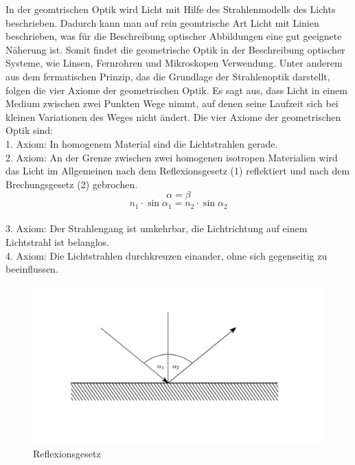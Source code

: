 In der geomtrischen Optik wird Licht mit Hilfe des Strahlenmodells des Lichts beschrieben. Dadurch kann man auf rein geomtrische Art Licht mit Linien beschrieben, was für die Beschreibung optischer Abbildungen eine gut geeignete Näherung ist. Somit findet die geometrische Optik in der Beschreibung optischer Systeme, wie Linsen, Fernrohren und Mikroskopen Verwendung. Unter anderem aus dem fermatischen Prinzip, das die Grundlage der Strahlenoptik darstellt, folgen die vier Axiome der geometrischen Optik. Es sagt aus, dass Licht in einem Medium zwischen zwei Punkten Wege nimmt, auf denen seine Laufzeit sich bei kleinen Variationen des Weges nicht ändert. Die vier Axiome der geometrischen Optik sind: \\
    1. Axiom: In homogenem Material sind die Lichtstrahlen gerade. \\
    2. Axiom: An der Grenze zwischen zwei homogenen isotropen Materialien wird das Licht im Allgemeinen nach dem Reflexionsgesetz (1) reflektiert und nach dem Brechungsgesetz (2) gebrochen. 
    \begin{equation}
        \alpha = \beta
    \end{equation}
    \begin{equation}
        n_1 \cdot \sin{\alpha_1} = n_2 \cdot \sin{\alpha_2}
    \end{equation}
    \\
    3. Axiom: Der Strahlengang ist umkehrbar, die Lichtrichtung auf einem Lichtstrahl ist belanglos. \\
    4. Axiom: Die Lichtstrahlen durchkreuzen einander, ohne sich gegenseitig zu beeinflussen. \\
    
    \begin{figure}
        \centering
        \includegraphics{Geometrische_Optik/Protokoll/fig/Reflexionsgesetz.png}
        \caption{Reflexionsgesetz}
        \label{fig:Reflexionsgesetz}
    \end{figure}
    
